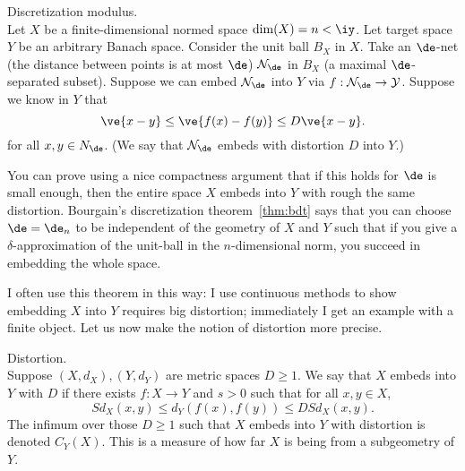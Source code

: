 \begin{df} Discretization modulus. \\
Let $X$ be a finite-dimensional normed space $\dim(X)=n<\iy$. Let target space $Y$ be an arbitrary Banach space.  Consider the unit ball $B_X$ in $X$. Take an $\de$-net (the distance between points is at most $\de$) $\cal N_\de$ in $B_X$ (a maximal $\de$-separated subset). Suppose we can embed $\cal N_\de$ into $Y$ via $f:\cal N_\de\to Y$. Suppose we know in $Y$ that
\[
\ve{x-y}\le \ve{f(x)-f(y)}\le D\ve{x-y}.
\]
for all $x, y \in N_{\de}$. 
(We say that $\cal N_\de$ embeds with distortion $D$ into $Y$.)
\end{df}
You can prove using a nice compactness argument that if this holds for $\de$ is small enough, then the entire space $X$ embeds into $Y$ with rough the same distortion. 
Bourgain's discretization theorem~\ref{thm:bdt} says that you can choose $\de=\de_n$ to be independent of the geometry of $X$ and $Y$ such that if you give a $\delta$-approximation of the unit-ball in the $n$-dimensional norm, you succeed in embedding the whole space. 

I often use this theorem in this way: I use continuous methods to show embedding $X$ into $Y$ requires big distortion; immediately I get an example with a finite object. Let us now make the notion of distortion more precise. 

\begin{df} Distortion. \\
Suppose $(X,d_X),(Y,d_Y)$ are metric spaces $D\ge 1$. We say that $X$ embeds into $Y$ with  $D$ if there exists $f:X\to Y$ and $s>0$ such that for all $x,y\in X$,
\[
Sd_X(x,y) \le d_Y(f(x),f(y)) \le DSd_X(x,y).
\]
The infimum over those $D\ge 1$ such that $X$ embeds into $Y$ with distortion is denoted $C_Y(X)$. This is a measure of how far $X$ is being from a subgeometry of $Y$. 
\end{df}

